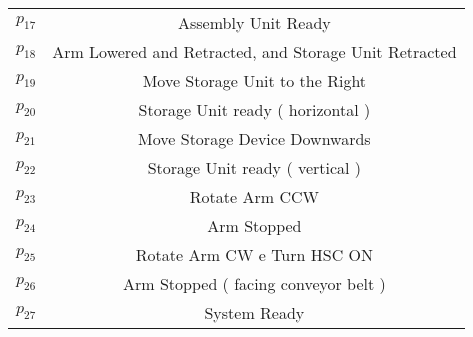 \begin{table}[htbp]
\begin{tabular}{cc}
\hyperlink{partialNet:p17}{\hypertarget{partialTable:p17}{$p_{17}$}} & Assembly Unit Ready\\
\hyperlink{partialNet:p18}{\hypertarget{partialTable:p18}{$p_{18}$}} & Arm Lowered and Retracted, and Storage Unit Retracted\\
\hyperlink{partialNet:p19}{\hypertarget{partialTable:p19}{$p_{19}$}} & Move Storage Unit to the Right\\
\hyperlink{partialNet:p20}{\hypertarget{partialTable:p20}{$p_{20}$}} & Storage Unit ready ( horizontal )\\
\hyperlink{partialNet:p21}{\hypertarget{partialTable:p21}{$p_{21}$}} & Move Storage Device Downwards\\
\hyperlink{partialNet:p22}{\hypertarget{partialTable:p22}{$p_{22}$}} & Storage Unit ready ( vertical )\\
\hyperlink{partialNet:p23}{\hypertarget{partialTable:p23}{$p_{23}$}} & Rotate Arm CCW\\
\hyperlink{partialNet:p24}{\hypertarget{partialTable:p24}{$p_{24}$}} & Arm Stopped\\
\hyperlink{partialNet:p25}{\hypertarget{partialTable:p25}{$p_{25}$}} & Rotate Arm CW e Turn HSC ON\\
\hyperlink{partialNet:p26}{\hypertarget{partialTable:p26}{$p_{26}$}} & Arm Stopped ( facing conveyor belt )\\
\hyperlink{partialNet:p27}{\hypertarget{partialTable:p27}{$p_{27}$}} & System Ready\\
\end{tabular}
\end{table}

